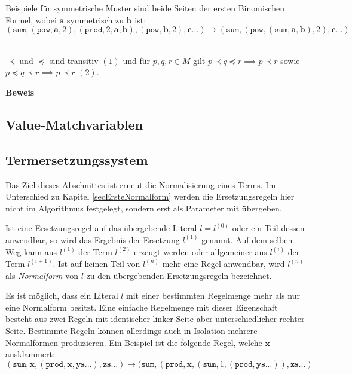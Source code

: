 
Beispiele für symmetrische Muster sind beide Seiten der ersten Binomischen Formel, wobei $\mathbf a$ symmetrisch zu $\mathbf b$ ist:
$$(\texttt{sum}, (\texttt{pow}, \mathbf a, 2), (\texttt{prod}, 2, \mathbf a, \mathbf b), (\texttt{pow}, \mathbf b, 2), \mathbf {c...}) \mapsto (\texttt{sum}, (\texttt{pow}, (\texttt{sum}, \mathbf a, \mathbf b), 2), \mathbf {c...})$$


\begin{lemma}\label{lemTransitivStark}~\\
$\prec$ und $\preceq$ sind transitiv $(1)$ und für $p, q, r \in M$  gilt $p \prec q \preceq r \implies p \prec r$ sowie $p \preceq q \prec r \implies p \prec r$ $(2)$. 
\end{lemma}

\textbf{Beweis}~\\

\subsection{Value-Matchvariablen}




\subsection{Termersetzungssystem} \label{subsecTermersetzungssystem}

Das Ziel dieses Abschnittes ist erneut die Normalisierung eines Terms. Im Unterschied zu Kapitel \ref{secErsteNormalform} werden die Ersetzungsregeln hier nicht im Algorithmus festgelegt, sondern erst als Parameter mit übergeben. 

Ist eine Ersetzungsregel auf das übergebende Literal $l = l^{(0)}$ oder ein Teil dessen anwendbar, so wird das Ergebnis der Ersetzung $l^{(1)}$ genannt. Auf dem selben Weg kann aus $l^{(1)}$ der Term $l^{(2)}$ erzeugt werden oder allgemeiner aus $l^{(i)}$ der Term $l^{(i+1)}$. Ist auf keinen Teil von $l^{(n)}$ mehr eine Regel anwendbar, wird $l^{(n)}$ als \emph{Normalform} von $l$ zu den übergebenden Ersetzungsregeln bezeichnet. 

Es ist möglich, dass ein Literal $l$ mit einer bestimmten Regelmenge mehr als nur eine Normalform besitzt. Eine einfache Regelmenge mit dieser Eigenschaft besteht aus zwei Regeln mit identischer linker Seite aber unterschiedlicher rechter Seite. Bestimmte Regeln können allerdings auch in Isolation mehrere Normalformen produzieren. Ein Beispiel ist die folgende Regel, welche $\mathbf x$ ausklammert:
$$(\texttt{sum}, \mathbf x, (\texttt{prod}, \mathbf x, \mathbf{ys...}), \mathbf{zs...}) 
\mapsto (\texttt{sum}, (\texttt{prod}, \mathbf x, (\texttt{sum}, 1, (\texttt{prod}, \mathbf{ys...})) , \mathbf{zs...})$$

